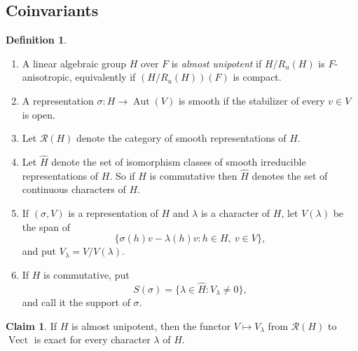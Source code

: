 \documentclass[11pt,a4paper,twoside]{amsart}
\theoremstyle{definition}
\newtheorem{definition}[theorem]{Definition}
\newtheorem{claim}[theorem]{Claim}
\theoremstyle{remark}
\newcommand{\bl}{\lambda}
\newcommand{\bs}{\sigma}
\newcommand{\mcR}{\mathcal R}
\newcommand{\Aut}{\operatorname{Aut}}
\newcommand{\Vect}{\operatorname{Vect}}
\begin{document}
\subsection{Coinvariants}
\begin{definition}\label{Vchi}
\begin{enumerate}
\item A linear algebraic group $H$ over $F$ is \emph{almost unipotent} if $H/R_u(H)$ is $F$-anisotropic, equivalently if $(H/R_u(H))(F)$ is compact.
\item A representation $\bs:H\to\Aut(V)$ is smooth if the stabilizer of every $v\in V$ is open.
\item Let $\mcR(H)$ denote the category of smooth representations of $H$.
\item Let $\widehat H$ denote the set of isomorphism classes of smooth irreducible representations of $H$. So if $H$ is commutative then  $\widehat H$ denotes the set of continuous characters of $H$.
\item If $(\bs,V)$ is a representation of $H$ and $\bl$ is a character of $H$, let $V(\bl)$ be the span of
$$
\{\bs(h)v-\bl(h)v:h\in H,\ v\in V\},
$$
and put $V_\bl=V/V(\bl)$.
\item If $H$ is commutative, put
$$
S(\bs)=\{\bl\in\widehat H:V_\bl\neq0\},
$$
and call it the support of $\bs$.
\end{enumerate}
\end{definition}
\begin{claim}
If $H$ is almost unipotent, then the functor $V\mapsto V_\bl$ from $\mcR(H)$ to $\Vect$ is exact for every character $\bl$ of $H$.
\end{claim}
\end{document}
